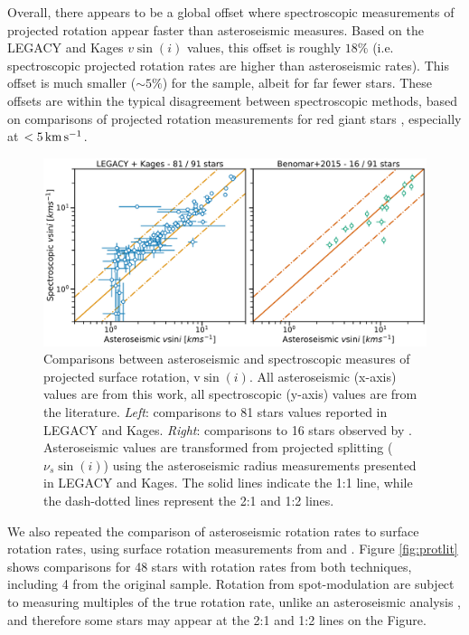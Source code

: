 Overall, there appears to be a global offset where spectroscopic measurements of projected rotation appear faster than asteroseismic measures. Based on the LEGACY and Kages $v\sin(i)$ values, this offset is roughly $18\%$ (i.e. spectroscopic projected rotation rates are higher than asteroseismic rates). This offset is much smaller ($\sim5\%$) for the \cite{benomar+2015} sample, albeit for far fewer stars. These offsets are within the typical disagreement between spectroscopic methods, based on comparisons of projected rotation measurements for red giant stars \cite[see Figure 2]{tayar+2015}, especially at $< 5\, \rm{km\,s^{-1}}$.\\

\begin{figure}
	\centering
	\includegraphics[width=\textwidth]{Images/vsini-comparison.pdf}
	\caption{Comparisons between asteroseismic and spectroscopic measures of projected surface rotation, $\textrm{v}\sin(i)$. All asteroseismic (x-axis) values are from this work, all spectroscopic (y-axis) values are from the literature. \textit{Left}: comparisons to 81 stars values reported in LEGACY and Kages. \textit{Right}: comparisons to 16 stars observed by \cite{benomar+2015}. Asteroseismic values are transformed from projected splitting ($\nu_s\sin(i)$) using the asteroseismic radius measurements presented in LEGACY and Kages. The solid lines indicate the 1:1 line, while the dash-dotted lines represent the 2:1 and 1:2 lines.}
	\label{fig:vsinilit}
\end{figure}

We also repeated the \cite{nielsen+2015} comparison of asteroseismic rotation rates to surface rotation rates, using surface rotation measurements from \cite{nielsen+2013} and \cite{garcia+2014}. Figure \ref{fig:protlit} shows comparisons for 48 stars with rotation rates from both techniques, including 4 from the original \cite{nielsen+2015} sample. Rotation from spot-modulation are subject to measuring multiples of the true rotation rate, unlike an asteroseismic analysis \cite{mcquillan+2014}, and therefore some stars may appear at the 2:1 and 1:2 lines on the Figure.

